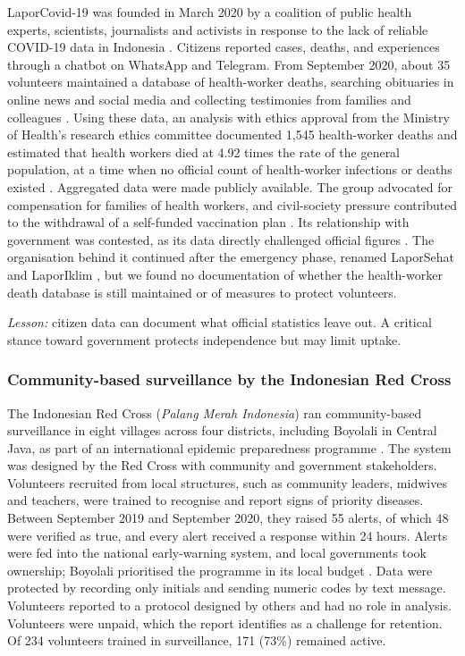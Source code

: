 \documentclass[
  number,
  preprint]{elsarticle}
\begin{document}
LaporCovid-19 was founded in March 2020 by a coalition of public health
experts, scientists, journalists and activists in response to the lack
of reliable COVID-19 data in Indonesia
\citep{laporcovid2021, rinaldi2024}. Citizens reported cases, deaths,
and experiences through a chatbot on WhatsApp and Telegram. From
September 2020, about 35 volunteers maintained a database of
health-worker deaths, searching obituaries in online news and social
media and collecting testimonies from families and colleagues
\citep{ekawati2022}. Using these data, an analysis with ethics approval
from the Ministry of Health's research ethics committee documented 1,545
health-worker deaths and estimated that health workers died at 4.92
times the rate of the general population, at a time when no official
count of health-worker infections or deaths existed \citep{ekawati2022}.
Aggregated data were made publicly available. The group advocated for
compensation for families of health workers, and civil-society pressure
contributed to the withdrawal of a self-funded vaccination plan
\citep{laporcovid2021}. Its relationship with government was contested,
as its data directly challenged official figures \citep{laporcovid2021}.
The organisation behind it continued after the emergency phase, renamed
LaporSehat and LaporIklim \citep{wargaberdaya2024, wargaberdaya_web},
but we found no documentation of whether the health-worker death
database is still maintained or of measures to protect volunteers.

\emph{Lesson:} citizen data can document what official statistics leave
out. A critical stance toward government protects independence but may
limit uptake.

\subsubsection{Community-based surveillance by the Indonesian Red
Cross}\label{community-based-surveillance-by-the-indonesian-red-cross}

The Indonesian Red Cross (\emph{Palang Merah Indonesia}) ran
community-based surveillance in eight villages across four districts,
including Boyolali in Central Java, as part of an international epidemic
preparedness programme \citep{ifrc2021}. The system was designed by the
Red Cross with community and government stakeholders. Volunteers
recruited from local structures, such as community leaders, midwives and
teachers, were trained to recognise and report signs of priority
diseases. Between September 2019 and September 2020, they raised 55
alerts, of which 48 were verified as true, and every alert received a
response within 24 hours. Alerts were fed into the national
early-warning system, and local governments took ownership; Boyolali
prioritised the programme in its local budget \citep{ifrc2021}. Data
were protected by recording only initials and sending numeric codes by
text message. Volunteers reported to a protocol designed by others and
had no role in analysis. Volunteers were unpaid, which the report
identifies as a challenge for retention. Of 234 volunteers trained in
surveillance, 171 (73\%) remained active.
\end{document}
